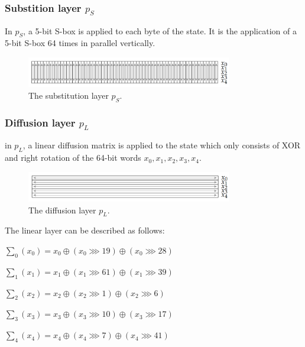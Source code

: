 \subsubsection{Substition layer $p_S$}
In $p_S$, a 5-bit S-box is applied to each byte of the state. It is the application of a 5-bit S-box 64 times in parallel vertically. \cite{ascon_specification, analysis_of_ascon}

\begin{figure}[htbp]
  \centering
  \includegraphics[width=0.8\textwidth]{images/substitution.png}
  \caption{The substitution layer $p_S$.}
  \label{fig:substition}
\end{figure}

\subsubsection{Diffusion layer $p_L$}
in $p_L$, a linear diffusion matrix is applied to the state which only consists of XOR and right rotation of the 64-bit words $x_0, x_1, x_2, x_3, x_4$. \cite{ascon_specification, analysis_of_ascon}

\begin{figure}[htbp]
  \centering
  \includegraphics[width=0.8\textwidth]{images/diffusion.png}
  \caption{The diffusion layer $p_L$. \cite{DBLP:journals/joc/DobraunigEMS21}}
  \label{fig:diffusion}
\end{figure}

The linear layer can be described as follows:


$\sum_0 (x_0) = x_0 \oplus (x_0 \ggg 19) \oplus (x_0 \ggg 28)$

$\sum_1 (x_1) = x_1 \oplus (x_1 \ggg 61) \oplus (x_1 \ggg 39)$

$\sum_2 (x_2) = x_2 \oplus (x_2 \ggg 1) \oplus (x_2 \ggg 6)$

$\sum_3 (x_3) = x_3 \oplus (x_3 \ggg 10) \oplus (x_3 \ggg 17)$

$\sum_4 (x_4) = x_4 \oplus (x_4 \ggg 7) \oplus (x_4 \ggg 41)$ 

\cite{ascon_specification,analysis_of_ascon}


